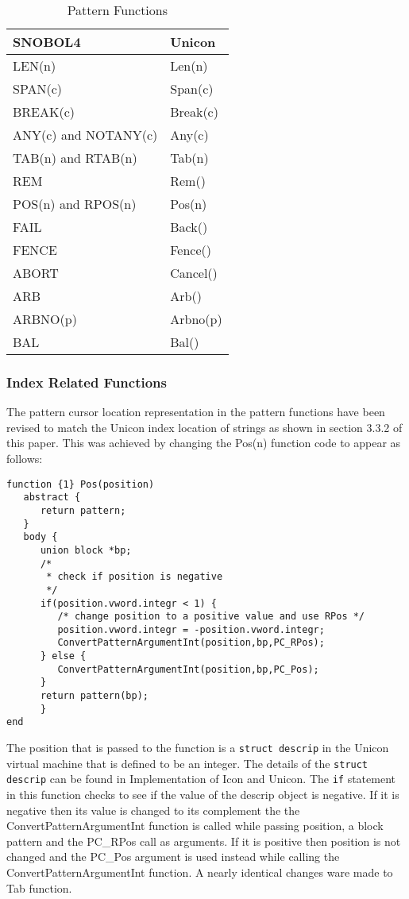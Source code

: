 \documentclass{article}
\begin{document}
\begin{table}[ht]
		\caption{Pattern Functions}
		\centering
		
		\begin{tabular}{|l|l|}
			\hline\hline
			SNOBOL4 & Unicon \\
			\hline
			LEN(n) & Len(n) \\
			SPAN(c) & Span(c)  \\
			BREAK(c) & Break(c) \\
			ANY(c) and NOTANY(c) & Any(c) \\
			TAB(n) and RTAB(n) & Tab(n) \\
			REM & Rem() \\
			POS(n) and RPOS(n) & Pos(n) \\
			FAIL & Back() \\
			FENCE & Fence() \\
			ABORT & Cancel() \\
			ARB & Arb() \\
			ARBNO(p) & Arbno(p) \\
			BAL & Bal() \\
			\hline
		\end{tabular}

\end{table}

\subsubsection{Index Related Functions}
The pattern cursor location representation in the pattern functions have been revised to match the Unicon index location of strings as shown in section 3.3.2 of this paper.  This was achieved by changing the Pos(n) function code to appear as follows:
\begin{verbatim}
function {1} Pos(position)
   abstract {
      return pattern;
   }
   body {
      union block *bp;
      /*
       * check if position is negative
       */
      if(position.vword.integr < 1) {
         /* change position to a positive value and use RPos */
         position.vword.integr = -position.vword.integr;
         ConvertPatternArgumentInt(position,bp,PC_RPos);
      } else {
         ConvertPatternArgumentInt(position,bp,PC_Pos);
      }
      return pattern(bp);
      }
end
\end{verbatim}
The position that is passed to the function is a \texttt{struct descrip} in the Unicon virtual machine that is defined to be an integer.  The details of the \texttt{struct descrip} can be found in Implementation of Icon and Unicon. \cite{JefferyImp}  The \texttt{if} statement in this function checks to see if the value of the descrip object is negative.  If it is negative then its value is changed to its complement the the ConvertPatternArgumentInt function is called while passing position, a block pattern and the PC\_RPos call as arguments.  If it is positive then position is not changed and the PC\_Pos argument is used instead while calling the ConvertPatternArgumentInt function.  A nearly identical changes ware made to Tab function.
\end{document}

